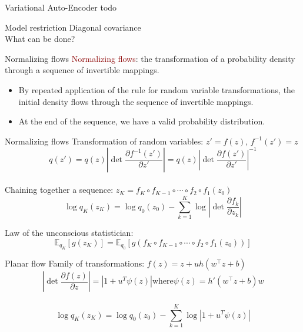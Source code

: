 \documentclass[unicode,11pt]{beamer}
\begin{document}
\begin{frame}[fragile]{Variational Auto-Encoder}
todo 
\end{frame}


\begin{frame}[fragile]{Model restriction}
Diagonal covariance\\
\vspace{5mm}
What can be done?
\end{frame}


\begin{frame}[fragile]{Normalizing flows}
\textcolor{darkred}{Normalizing flows}: the transformation of a probability density through
a sequence of invertible mappings.
\begin{itemize}
  \item By repeated application of the rule for random variable transformations, the initial
density flows through the sequence of invertible mappings.
  \item At the end of the sequence, we have a valid probability distribution.
\end{itemize}

\end{frame}

\begin{frame}[fragile]{Normalizing flows}
Transformation of random variables: $z' = f(z)$, $f^{-1}(z') = z$\\
$$q(z') = q(z) \left\vert \det \frac{\partial f^{-1}(z')}{\partial z'} \right\vert = 
q(z) \left\vert \det \frac{\partial f(z')}{\partial z'} \right\vert^{-1}$$\\
Chaining together a sequence: $z_K = f_K \circ f_{K−1} \circ \cdots \circ f_2 \circ f_1(z_0)$\\
$$\log q_K(z_K) = \log q_0(z_0) − \sum_{k=1}^K \log \left\vert \det \frac{\partial f_k}{\partial z_k} \right\vert $$

Law of the unconscious statistician:\\
$$\mathbb{E}_{q_K} \left[g(z_K)\right] = \mathbb{E}_{q_0} \left[ g(f_K \circ f_{K−1} \circ \cdots \circ f_2 \circ f_1(z_0)) \right] $$
\end{frame}

\begin{frame}[fragile]{Planar flow}
Family of transformations: $f(z) = z + uh(w^⊤z + b)$\\
\vspace{5mm}
$$\left\vert \det \frac{\partial f(z)}{\partial z} \right\vert = \left\vert 1 + u^T \psi(z) \right\vert \text{where} \psi(z) = h'(w^⊤z + b)w$$ \\
$$\log q_K(z_K) = \log q_0(z_0) − \sum_{k=1}^K \log \left\vert 1 + u^T \psi(z) \right\vert $$
\end{frame}
\end{document}
